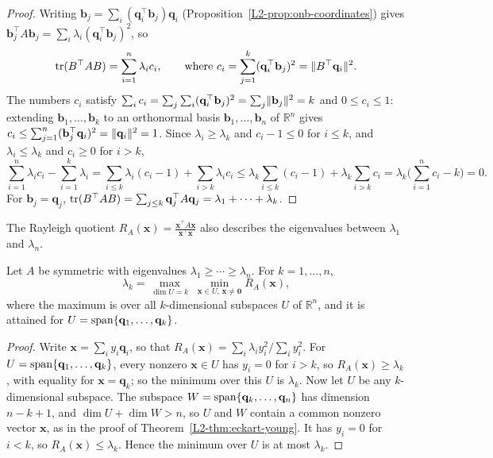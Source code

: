\begin{proof}
    Writing $\mathbf{b}_j = \sum_i (\mathbf{q}_i^\top \mathbf{b}_j)\mathbf{q}_i$ (Proposition~\ref{L2-prop:onb-coordinates}) gives $\mathbf{b}_j^\top A\mathbf{b}_j = \sum_i \lambda_i (\mathbf{q}_i^\top \mathbf{b}_j)^2$, so
    \[\operatorname{tr}(B^\top AB) = \sum_{i=1}^n \lambda_i c_i, \qquad \text{where } c_i = \sum_{j=1}^k (\mathbf{q}_i^\top \mathbf{b}_j)^2 = \lVert B^\top \mathbf{q}_i \rVert^2.\]
    The numbers $c_i$ satisfy $\sum_i c_i = \sum_j \sum_i (\mathbf{q}_i^\top \mathbf{b}_j)^2 = \sum_j \lVert \mathbf{b}_j \rVert^2 = k$ and $0 \leq c_i \leq 1$: extending $\mathbf{b}_1, \ldots, \mathbf{b}_k$ to an orthonormal basis $\mathbf{b}_1, \ldots, \mathbf{b}_n$ of $\mathbb{R}^n$ gives $c_i \leq \sum_{j=1}^n (\mathbf{b}_j^\top \mathbf{q}_i)^2 = \lVert \mathbf{q}_i \rVert^2 = 1$. Since $\lambda_i \geq \lambda_k$ and $c_i - 1 \leq 0$ for $i \leq k$, and $\lambda_i \leq \lambda_k$ and $c_i \geq 0$ for $i > k$,
    \[\sum_{i=1}^n \lambda_i c_i - \sum_{i=1}^k \lambda_i = \sum_{i \leq k} \lambda_i(c_i - 1) + \sum_{i > k} \lambda_i c_i \leq \lambda_k\sum_{i \leq k}(c_i - 1) + \lambda_k\sum_{i > k} c_i = \lambda_k\Big(\sum_{i=1}^n c_i - k\Big) = 0.\]
    For $\mathbf{b}_j = \mathbf{q}_j$, $\operatorname{tr}(B^\top AB) = \sum_{j \leq k} \mathbf{q}_j^\top A\mathbf{q}_j = \lambda_1 + \cdots + \lambda_k$.
\end{proof}

The Rayleigh quotient $R_A(\mathbf{x}) = \frac{\mathbf{x}^\top A\mathbf{x}}{\mathbf{x}^\top\mathbf{x}}$ also describes the eigenvalues between $\lambda_1$ and $\lambda_n$.

\begin{theorem}\label{L2-thm:courant-fischer}
    Let $A$ be symmetric with eigenvalues $\lambda_1 \geq \cdots \geq \lambda_n$. For $k = 1, \ldots, n$,
    \[\lambda_k = \max_{\dim U = k}\; \min_{\mathbf{x} \in U, \, \mathbf{x} \neq \mathbf{0}} R_A(\mathbf{x}),\]
    where the maximum is over all $k$-dimensional subspaces $U$ of $\mathbb{R}^n$, and it is attained for $U = \operatorname{span}\{\mathbf{q}_1, \ldots, \mathbf{q}_k\}$.
\end{theorem}

\begin{proof}
    Write $\mathbf{x} = \sum_i y_i\mathbf{q}_i$, so that $R_A(\mathbf{x}) = \sum_i \lambda_iy_i^2 / \sum_i y_i^2$. For $U = \operatorname{span}\{\mathbf{q}_1, \ldots, \mathbf{q}_k\}$, every nonzero $\mathbf{x} \in U$ has $y_i = 0$ for $i > k$, so $R_A(\mathbf{x}) \geq \lambda_k$, with equality for $\mathbf{x} = \mathbf{q}_k$; so the minimum over this $U$ is $\lambda_k$. Now let $U$ be any $k$-dimensional subspace. The subspace $W = \operatorname{span}\{\mathbf{q}_k, \ldots, \mathbf{q}_n\}$ has dimension $n - k + 1$, and $\dim U + \dim W > n$, so $U$ and $W$ contain a common nonzero vector $\mathbf{x}$, as in the proof of Theorem~\ref{L2-thm:eckart-young}. It has $y_i = 0$ for $i < k$, so $R_A(\mathbf{x}) \leq \lambda_k$. Hence the minimum over $U$ is at most $\lambda_k$.
\end{proof}

